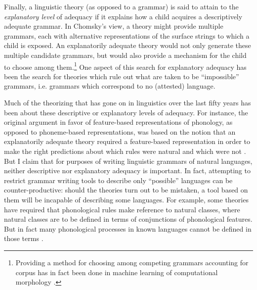Finally, a linguistic theory (as opposed to a grammar) is said to attain to the {\textit{explanatory level}} of adequacy if it explains how a child acquires a descriptively adequate grammar. In Chomsky's view, a theory might provide multiple grammars, each with alternative representations of the surface strings to which a child is exposed. An explanatorily adequate theory would not only generate these multiple candidate grammars, but would also provide a mechanism for the child to choose among them.\footnote{Providing
  a method for choosing among competing grammars accounting for corpus has in fact been done in machine learning of computational morphology \citep{Goldsmith2001}.
} 
One aspect of this search for explanatory adequacy has been the search for theories which rule out what are taken to be ``impossible'' grammars, i.e. grammars which correspond to no (attested) language.

Much of the theorizing that has gone on in linguistics over the last fifty years has been about these descriptive or explanatory levels of adequacy. For instance, the original argument in favor of feature-based representations of phonology, as opposed to phoneme-based representations, was based on the notion that an explanatorily adequate theory required a feature-based representation in order to make the right predictions about which rules were natural and which were not \citep{ChomskyEtAl1965}. But I claim that for purposes of writing linguistic grammars of natural languages, neither descriptive nor explanatory adequacy is important. In fact, attempting to restrict grammar writing tools to describe only ``possible'' languages can be counter-productive: should the theories turn out to be mistaken, a tool based on them will be incapable of describing some languages. For example, some theories have required that phonological rules make reference to natural classes, where natural classes are to be defined in terms of conjunctions of phonological features. But in fact many phonological processes in known languages cannot be defined in those terms \citep{Mielke2008}.

